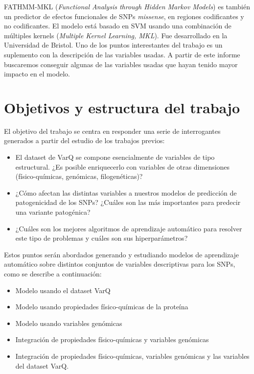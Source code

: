 FATHMM-MKL (\textit{Functional Analysis through Hidden Markov Models}) \cite{Shihab2015} es también un predictor de efectos funcionales de SNPs \textit{missense}, en regiones codificantes y no codificantes. El modelo está basado en SVM usando una combinación de múltiples kernels (\textit{Multiple Kernel Learning, MKL}). Fue desarrollado en la Universidad de Bristol. Uno de los puntos interestantes del trabajo es un suplemento con la descripción de las variables usadas. A partir de este informe buscaremos conseguir algunas de las variables usadas que hayan tenido mayor impacto en el modelo.



\section{Objetivos y estructura del trabajo}

El objetivo del trabajo se centra en responder una serie de interrogantes generados a partir del estudio de los trabajos previos:

\begin{itemize}
    \item El dataset de VarQ se compone esencialmente de variables de tipo estructural. ¿Es posible enriquecerlo con variables de otras dimensiones (físico-químicas, genómicas, filogenéticas)?
    \item ¿Cómo afectan las distintas variables a nuestros modelos de predicción de patogenicidad de los SNPs? ¿Cuáles son las más importantes para predecir una variante patogénica?
    \item ¿Cuáles son los mejores algoritmos de aprendizaje automático para resolver este tipo de problemas y cuáles son sus hiperparámetros?
    
\end{itemize}

Estos puntos serán abordados generando y estudiando modelos de aprendizaje automático sobre distintos conjuntos de variables descriptivas para los SNPs, como se describe a continuación:

\begin{itemize}
    \item Modelo usando el dataset VarQ
    \item Modelo usando propiedades físico-químicas de la proteína
    \item Modelo usando variables genómicas
    \item Integración de propiedades físico-químicas y variables genómicas
    \item Integración de propiedades físico-químicas, variables genómicas y las variables del dataset VarQ.
\end{itemize}


